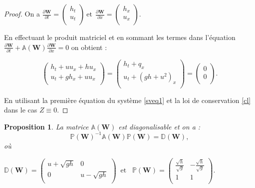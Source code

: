 \documentclass[
11pt, %
francais, %
singlespacing, %
headsepline, %
f%
]{MastersDoctoralThesis} %
\newtheorem{prop}{Proposition}
\theoremstyle{definition}
\begin{document}
\begin{proof}

On a $\frac{\partial\textbf{W}}{\partial t}=\begin{pmatrix}
   h_{t} \\
    u_{t} \\
\end{pmatrix} ~\text{et} ~~ \frac{\partial\textbf{W}}{\partial x}=\begin{pmatrix}
   h_{x} \\
    u_{x} \\
\end{pmatrix}$.

En effectuant le produit matriciel et en sommant les termes dans l'équation  $ \frac{\partial \textbf{W}}{\partial t} +\mathbb{A}(\textbf{W}) \frac{\partial\textbf{W}}{\partial x} = 0 \label{ql} $ on obtient :

$$
\begin{pmatrix}
   h_{t} + uu_{x}+hu_{x}\\
    u_{t} + gh_{x}+uu_{x}\\
\end{pmatrix} = \begin{pmatrix}
h_{t} + q_{x} \\
u_{t} + (gh+u^{2})_{x}\\
\end{pmatrix} =
\begin{pmatrix}
0 \\
0\\
\end{pmatrix}.
$$

En utilisant la première équation du système \eqref{sveq1} et la loi de conservation \eqref{cl} dans le cas $Z\equiv 0$.

\end{proof}

\begin{prop}
La matrice $\mathbb{A}(\textbf{W})$ est diagonalisable et on a :
$$
\mathbb{P}(\textbf{W})^{-1}\mathbb{A}(\textbf{W})\mathbb{P}(\textbf{W})=\mathbb{D}(\textbf{W}),
$$
où 

\begin{center}

$\mathbb{D}(\textbf{W}) =\begin{pmatrix}
   u+\sqrt{gh} & 0  \\
   0 & u-\sqrt{gh}  \\
\end{pmatrix} \phantom{..} \text{et}\phantom{...} \mathbb{P}(\textbf{W}) =\begin{pmatrix}
   \frac{\sqrt{h}}{\sqrt{g}} & -\frac{\sqrt{h}}{\sqrt{g}} \\
   1 & 1  \\
\end{pmatrix}.
$
\end{center}

\end{prop}
\end{document}
